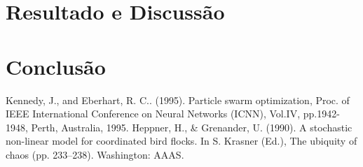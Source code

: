 \documentclass[conference]{IEEEtran}
\begin{document}
\section{Resultado e Discussão}



\section*{Conclusão}




\begin{thebibliography}{00}

 Kennedy, J., and Eberhart, R. C.. (1995). Particle swarm optimization, Proc. of IEEE International Conference on Neural Networks (ICNN), Vol.IV, pp.1942-1948, Perth, Australia, 1995.
 Heppner, H., \& Grenander, U. (1990). A stochastic non-linear model for coordinated bird flocks. In S. Krasner
(Ed.), The ubiquity of chaos (pp. 233–238). Washington: AAAS.
\end{thebibliography}
\vspace{12pt}
\end{document}
